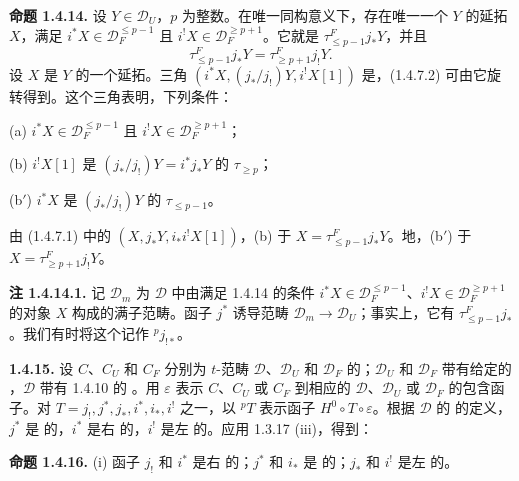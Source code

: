 \par\medskip\noindent\textbf{命题 1.4.14.}
设 $Y\in\mathcal D_U$，$p$ 为整数。在唯一同构意义下，存在唯一一个 $Y$ 的延拓 $X$，满足 $i^*X\in\mathcal D_F^{\le p-1}$ 且 $i^!X\in\mathcal D_F^{\ge p+1}$。它就是 $\tau^F_{\le p-1}j_*Y$，并且
\[
\tau^F_{\le p-1}j_*Y=\tau^F_{\ge p+1}j_!Y.
\]
设 $X$ 是 $Y$ 的一个延拓。三角 $(i^*X,(j_*/j_!)Y,i^!X[1])$ 是，(1.4.7.2) 可由它旋转得到。这个三角表明，下列条件：

(a) $i^*X\in\mathcal D_F^{\le p-1}$ 且 $i^!X\in\mathcal D_F^{\ge p+1}$；

(b) $i^!X[1]$ 是 $(j_*/j_!)Y=i^*j_*Y$ 的 $\tau_{\ge p}$；

(b$'$) $i^*X$ 是 $(j_*/j_!)Y$ 的 $\tau_{\le p-1}$。

由 (1.4.7.1) 中的 $(X,j_*Y,i_*i^!X[1])$，(b) 于 $X=\tau^F_{\le p-1}j_*Y$。地，(b$'$) 于 $X=\tau^F_{\ge p+1}j_!Y$。

\par\medskip\noindent\textbf{注 1.4.14.1.}
记 $\mathcal D_m$ 为 $\mathcal D$ 中由满足 1.4.14 的条件 $i^*X\in\mathcal D_F^{\le p-1}$、$i^!X\in\mathcal D_F^{\ge p+1}$ 的对象 $X$ 构成的满子范畴。函子 $j^*$ 诱导范畴 $\mathcal D_m\to\mathcal D_U$；事实上，它有 $\tau^F_{\le p-1}j_*$。我们有时将这个记作 ${}^p j_{!*}$。

\par\medskip\noindent\textbf{1.4.15.}
设 $C$、$C_U$ 和 $C_F$ 分别为 $t$-范畴 $\mathcal D$、$\mathcal D_U$ 和 $\mathcal D_F$ 的；$\mathcal D_U$ 和 $\mathcal D_F$ 带有给定的 ，$\mathcal D$ 带有 1.4.10 的 。用 $\varepsilon$ 表示 $C$、$C_U$ 或 $C_F$ 到相应的 $\mathcal D$、$\mathcal D_U$ 或 $\mathcal D_F$ 的包含函子。对 $T=j_!,j^*,j_*,i^*,i_*,i^!$ 之一，以 ${}^pT$ 表示函子 $H^0\circ T\circ\varepsilon$。根据 $\mathcal D$ 的 的定义，$j^*$ 是 的，$i^*$ 是右 的，$i^!$ 是左 的。应用 1.3.17 (iii)，得到：

\par\medskip\noindent\textbf{命题 1.4.16.}
(i) 函子 $j_!$ 和 $i^*$ 是右 的；$j^*$ 和 $i_*$ 是 的；$j_*$ 和 $i^!$ 是左 的。


